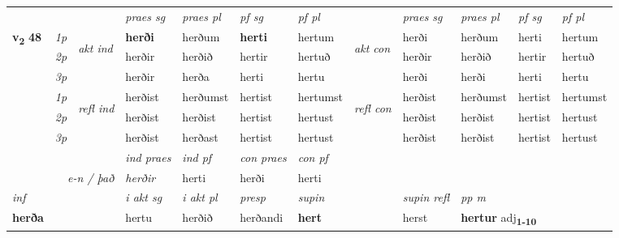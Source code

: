 \begin{longtable}[l]{X>{\footnotesize\itshape}llXXXXlXXXX}
 & &   & \textit{praes sg}  & \textit{praes pl}    & \textit{ pf sg} & \textit{pf pl} & & \textit{praes sg}  & \textit{praes pl}    & \textit{pf sg} & \textit{pf pl }  \\ \cmidrule{4-7} \cmidrule{9-12}
 \multirow{2}{*}{{{\textbf{v{\textsubscript{2}}} \Large{\textbf{48}}}}}  & 1p & \multirow{3}{*}{\begin{turn}{90}\textit{akt ind}\end{turn}} & \textbf{herði} & herðum & \textbf{herti} & hertum & \multirow{3}{*}{\begin{turn}{90}\textit{akt con}\end{turn}} &herði & herðum & herti & hertum\\*
 & 2p &  &  herðir  & herðið & hertir & hertuð & & herðir & herðið & hertir & hertuð \\*
 & 3p &  & herðir & herða & herti & hertu & & herði & herði& herti & hertu \\*
\cmidrule{4-7} \cmidrule{9-12}
 & 1p & \multirow{3}{*}{\begin{turn}{90}\textit{refl ind}\end{turn}}  & herðist & herðumst & hertist & hertumst & \multirow{3}{*}{\begin{turn}{90}\textit{refl con}\end{turn}}  &herðist & herðumst & hertist & hertumst \\*
 & 2p &  & herðist & herðist & hertist & hertust & &herðist & herðist & hertist & hertust \\*
 & 3p  & & herðist & herðast & hertist & hertust & & herðist & herðist& hertist & hertust \\*
\cmidrule{4-7} \cmidrule{9-12}

   && &  \textit{ind praes} & \textit{ind pf} & \textit{con praes} & \textit{con pf} \\*
\multicolumn{3}{r}{\textit{e-n / það}} & herðir & herti & herði & herti \\*

\cmidrule{4-7}
   {\textit{inf}} & &  & \textit{i akt sg} & \textit{i akt pl}   & \textit{presp} & \textit{supin} && \textit{supin refl} & \textit{pp m} \\*
  {\textbf{herða}} & && hertu  & herðið   & herðandi &  \textbf{hert} && herst & \multicolumn{2}{l}{\textbf{hertur} adj\textbf{\textsubscript{1-10}}} \\*

\midrule


\end{longtable}
